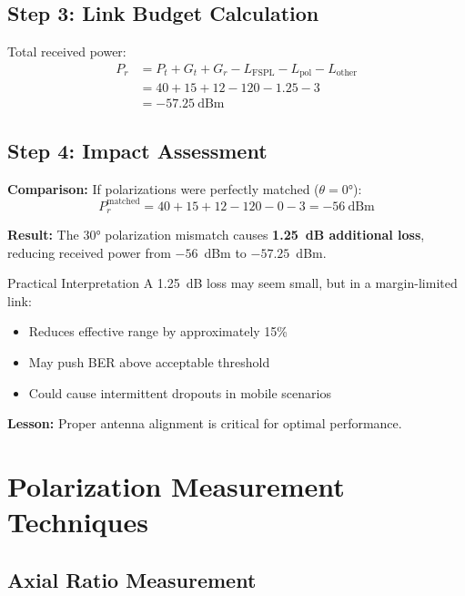 \begin{center}
\subsection*{Step 3: Link Budget Calculation}

Total received power:
\begin{align}
P_r &= P_t + G_t + G_r - L_{\text{FSPL}} - L_{\text{pol}} - L_{\text{other}} \\
&= 40 + 15 + 12 - 120 - 1.25 - 3 \\
&= -57.25~\text{dBm}
\end{align}

\subsection*{Step 4: Impact Assessment}

\textbf{Comparison:} If polarizations were perfectly matched ($\theta = 0°$):
\begin{equation}
P_r^{\text{matched}} = 40 + 15 + 12 - 120 - 0 - 3 = -56~\text{dBm}
\end{equation}

\textbf{Result:} The $30°$ polarization mismatch causes \textbf{1.25~dB additional loss}, reducing received power from $-56$~dBm to $-57.25$~dBm.

\begin{calloutbox}[colback=black!8!white,colframe=black]{Practical Interpretation}
A 1.25~dB loss may seem small, but in a margin-limited link:
\begin{itemize}
\item Reduces effective range by approximately 15\%
\item May push BER above acceptable threshold
\item Could cause intermittent dropouts in mobile scenarios
\end{itemize}

\textbf{Lesson:} Proper antenna alignment is critical for optimal performance.
\end{calloutbox}

\section{Polarization Measurement Techniques}

\subsection{Axial Ratio Measurement}


\end{center}
